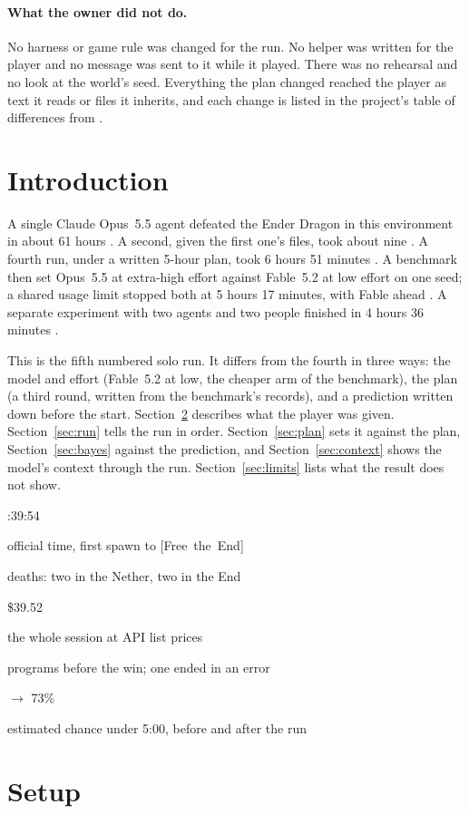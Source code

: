 \documentclass[11pt,a4paper]{article}
\newcommand{\statcell}[2]{%
  \begin{minipage}[t]{0.177\textwidth}\raggedright
    {\sffamily\fontsize{17}{20}\selectfont #1\par}\vspace{3pt}
    {\sffamily\fontsize{7}{8.6}\selectfont\color{inkgrey}#2\par}
  \end{minipage}}
\newcommand{\statsep}{\hspace{0.5em}{\color{rulegrey}\vrule width 0.6pt}\hspace{0.6em}}
\newcommand{\adv}[1]{\mbox{\textsf{[#1]}}}
\begin{document}
\paragraph{What the owner did not do.} No harness or game rule was changed for the run. No helper was written for the player and no message was sent to it while it played. There was no rehearsal and no look at the world's seed. Everything the plan changed reached the player as text it reads or files it inherits, and each change is listed in the project's table of differences from \citet{faldor2026team}.

\section{Introduction}

A single Claude Opus~5.5 agent defeated the Ender Dragon in this environment in about 61 hours \citep{batsuk2026single}. A second, given the first one's files, took about nine \citep{batsuk2026second}. A fourth run, under a written 5-hour plan, took 6 hours 51 minutes \citep{batsuk2026fourth}. A benchmark then set Opus~5.5 at extra-high effort against Fable~5.2 at low effort on one seed; a shared usage limit stopped both at 5 hours 17 minutes, with Fable ahead \citep{batsuk2026bench}. A separate experiment with two agents and two people finished in 4 hours 36 minutes \citep{batsuk2026team}.

This is the fifth numbered solo run. It differs from the fourth in three ways: the model and effort (Fable~5.2 at low, the cheaper arm of the benchmark), the plan (a third round, written from the benchmark's records), and a prediction written down before the start. Section~\ref{sec:setup} describes what the player was given. Section~\ref{sec:run} tells the run in order. Section~\ref{sec:plan} sets it against the plan, Section~\ref{sec:bayes} against the prediction, and Section~\ref{sec:context} shows the model's context through the run. Section~\ref{sec:limits} lists what the result does not show.

\vspace{10pt}
\noindent
\statcell{4:39:54}{official time, first spawn to \adv{Free the End}}\statsep
\statcell{4}{deaths: two in the Nether, two in the End}\statsep
\statcell{\$39.52}{the whole session at API list prices}\statsep
\statcell{197}{programs before the win; one ended in an error}\statsep
\statcell{50 $\rightarrow$ 73\%}{estimated chance under 5:00, before and after the run}

\section{Setup}
\label{sec:setup}
\end{document}
